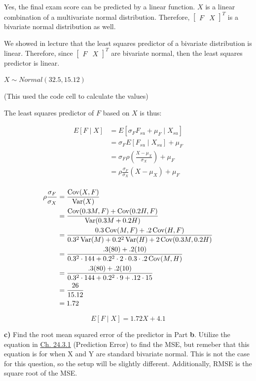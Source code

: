 \documentclass[11pt]{article}
\begin{document}
Yes, the final exam score can be predicted by a linear function. $X$ is a linear combination of a multivariate normal distribution. Therefore, $\begin{bmatrix}
	F &X
\end{bmatrix}^{T}$ is a bivariate normal distribution as well. 



We showed in lecture that the least squares predictor of a bivariate distribution is linear. Therefore, since $\begin{bmatrix}
	F &X	
\end{bmatrix}^{T}$ are bivariate normal, then the least squares predictor is linear. 


$X \sim Normal(32.5, 15.12)$  

(This used the code cell to calculate the values) 

The least squares predictor of $F$ based on $X$ is thus:


\begin{align*}
	E[F \mid X] &= E[\sigma_{F}F_{su} + \mu_{F} \mid X_{su}] \\
	&= \sigma_{F}E[F_{su} \mid X_{su}] + \mu _{F} \\
	&= \sigma_{F} \rho \left( \frac{X-\mu _{X}}{\sigma_{X}} \right)   + \mu _{F}\\ 
	&= \rho \frac{\sigma_{F}}{\sigma_{X}} \left( X-\mu _{X} \right) +\mu _{F} \\
\end{align*} 

\begin{align*}
	\rho \frac{\sigma_{F}}{\sigma_{X}}  &= \frac{\operatorname{Cov}(X, F)}{\operatorname{Var}(X)} \\
	&= \frac{\operatorname{Cov}(0.3M, F) + \operatorname{Cov}(0.2H, F)}{\operatorname{Var}(0.3M + 0.2H)} \\
	&= \frac{0.3 \operatorname{Cov}(M,F) + .2\operatorname{Cov}(H,F)}{0.3^{2} \operatorname{Var}(M) + 0.2^{2}\operatorname{Var}(H) + 2\operatorname{Cov}(0.3M, 0.2H)} \\
	&= \frac{.3 (80) + .2 (10)}{0.3^{2} \cdot  144 + 0.2^{2} \cdot 2 \cdot 0.3 \cdot .2 \operatorname{Cov}(M, H) } \\
	&= \frac{.3(80) + .2 (10)}{0.3^{2} \cdot 144 + 0.2^{2} \cdot 9 + .12 \cdot 15} \\
	&= \frac{26}{15.12} \\
	&= 1.72 \\
\end{align*}

\[
E[F \mid X] = 1.72 X  + 4.1
\]

\textbf{c)} Find the root mean squared error of the predictor in Part
\textbf{b}. Utilize the equation in
\href{https://data140.org/textbook/content/chapter-24/regression-and-bivariate-normal/\#prediction-error}{Ch.
24.3.1} (Prediction Error) to find the MSE, but remeber that this
equation is for when X and Y are standard bivariate normal. This is not
the case for this question, so the setup will be slightly different.
Additionally, RMSE is the square root of the MSE.
\end{document}
